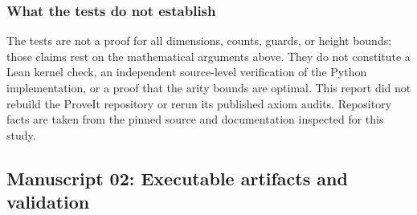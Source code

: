 \documentclass[11pt,a4paper]{article}
\theoremstyle{definition}
\theoremstyle{remark}
\begin{document}
\subsubsection{What the tests do not establish}
The tests are not a proof for all dimensions, counts, guards, or height bounds; those claims rest on the mathematical arguments above. They do not constitute a Lean kernel check, an independent source-level verification of the Python implementation, or a proof that the arity bounds are optimal. This report did not rebuild the ProveIt repository or rerun its published axiom audits. Repository facts are taken from the pinned source and documentation inspected for this study.


\subsection{Manuscript 02: Executable artifacts and validation}
\label{cdc:pt:sec:implementation}
\end{document}
